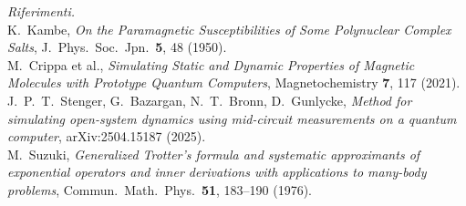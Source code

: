 \documentclass[11pt,a4paper]{article}
\begin{document}
\bigskip
\noindent\footnotesize\textit{Riferimenti.}\\
K.~Kambe, \emph{On the Paramagnetic Susceptibilities of Some Polynuclear
Complex Salts}, J.\ Phys.\ Soc.\ Jpn.\ \textbf{5}, 48 (1950).\\
M.~Crippa et al., \emph{Simulating Static and Dynamic Properties of
Magnetic Molecules with Prototype Quantum Computers}, Magnetochemistry
\textbf{7}, 117 (2021).\\
J.~P.~T.~Stenger, G.~Bazargan, N.~T.~Bronn, D.~Gunlycke, \emph{Method for
simulating open-system dynamics using mid-circuit measurements on a
quantum computer}, arXiv:2504.15187 (2025).\\
M.~Suzuki, \emph{Generalized Trotter's formula and systematic
approximants of exponential operators and inner derivations with
applications to many-body problems}, Commun.\ Math.\ Phys.\ \textbf{51},
183--190 (1976).
\end{document}
